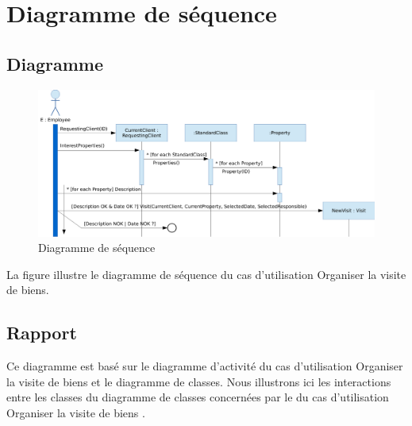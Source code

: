 \chapter{Diagramme de séquence}

\section{Diagramme}

\begin{figure}
  \centering
  \includegraphics[scale=0.67,angle=90]{IMG/id}
  \caption{Diagramme de séquence}
  \label{img_id}
\end{figure}

La figure  illustre le diagramme de séquence du cas d'utilisation \og{}Organiser la visite de biens\fg{}.

\section{Rapport}

Ce diagramme est basé sur le diagramme d'activité du cas d'utilisation \og{}Organiser la visite de biens\fg{} et le diagramme de classes. Nous illustrons ici les interactions entre les classes du diagramme de classes concernées par le du cas d'utilisation \og{}Organiser la visite de biens\fg{} .